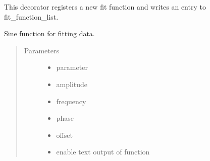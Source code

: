 \documentclass[letterpaper,10pt,english]{sphinxmanual}
\begin{document}
\begin{fulllineitems}
\label{\detokenize{fit-functions:fit_functions.register_fit_function}}
This decorator registers a new fit function and writes an entry to fit\_function\_list.

\end{fulllineitems}


\begin{fulllineitems}
\label{\detokenize{fit-functions:fit_functions.sine}}
Sine function for fitting data.
\begin{quote}\begin{description}
\item[{Parameters}] \leavevmode\begin{itemize}
\item {} 
 \textendash{} parameter

\item {} 
 \textendash{} amplitude

\item {} 
 \textendash{} frequency

\item {} 
 \textendash{} phase

\item {} 
 \textendash{} offset

\item {} 
 \textendash{} enable text output of function

\end{itemize}

\end{description}\end{quote}

\end{fulllineitems}
\end{document}
